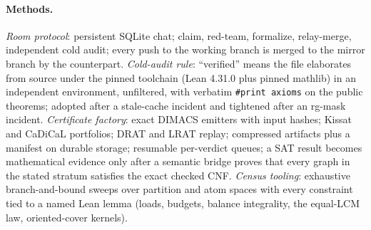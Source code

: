 \documentclass{anvil-paper}
\theoremstyle{definition}
\begin{document}
\paragraph{Methods.} \emph{Room protocol}: persistent SQLite chat; claim, red-team, formalize, relay-merge, independent cold audit; every push to the working branch is merged to the mirror branch by the counterpart. \emph{Cold-audit rule}: ``verified'' means the file elaborates from source under the pinned toolchain (Lean 4.31.0 plus pinned mathlib) in an independent environment, unfiltered, with verbatim \texttt{\#print axioms} on the public theorems; adopted after a stale-cache incident and tightened after an rg-mask incident. \emph{Certificate factory}: exact DIMACS emitters with input hashes; Kissat and CaDiCaL portfolios; DRAT and LRAT replay; compressed artifacts plus a manifest on durable storage; resumable per-verdict queues; a SAT result becomes mathematical evidence only after a semantic bridge proves that every graph in the stated stratum satisfies the exact checked CNF. \emph{Census tooling}: exhaustive branch-and-bound sweeps over partition and atom spaces with every constraint tied to a named Lean lemma (loads, budgets, balance integrality, the equal-LCM law, oriented-cover kernels).



\end{document}
